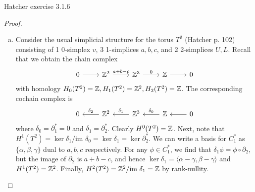 \documentclass{../../mathnotes}
\begin{document}
\begin{prop}
    Hatcher exercise 3.1.6
\end{prop}
\begin{proof}\hfill
    \begin{enumerate}[(a)]
        \item Consider the usual simplicial structure for the torus $T^2$ (Hatcher p. 102) consisting
            of 1 0-simplex $v$, 3 1-simplices $a,b,c$, and 2 2-simplices $U,L$. Recall that
            we obtain the chain complex
            \begin{equation*}
                \begin{tikzcd}
                    0\ar{r} & \Z^2\ar{r}{a+b-c} & \Z^3\ar{r}{0} & \Z\ar{r} & 0
                \end{tikzcd}
            \end{equation*}
            with homology $H_0(T^2)=\mathbb{Z},H_1(T^2)=\mathbb{Z}^2,H_2(T^2)=\mathbb{Z}$. The corresponding cochain complex is
            \begin{equation*}
                \begin{tikzcd}
                    0 & \Z^2\ar[swap]{l}{\delta_2} & \Z^3\ar[swap]{l}{\delta_1} & \Z\ar[swap]{l}{\delta_0} & 0\ar{l}
                \end{tikzcd}
            \end{equation*}
            where $\delta_0=\partial_1^*=0$ and $\delta_1=\partial_2^*$. Clearly $H^0(T^2)=\mathbb{Z}$. Next, note that
            $H^1(T^2)=\ker\delta_1/\text{im }\delta_0=\ker\delta_1=\ker\partial_2^*$. We can write a basis for $C_1^*$
            as $\{\alpha,\beta,\gamma\}$ dual to $a,b,c$ respectively. For any $\phi\in C_1^*$, we find that
            $\delta_1\phi=\phi\circ\partial_2$, but the image of $\partial_2$ is $a+b-c$, and hence
            $\ker\delta_1=\langle \alpha-\gamma,\beta-\gamma \rangle$ and $H^1(T^2)=\mathbb{Z}^2$. Finally,
            $H^2(T^2)=\mathbb{Z}^2/\text{im }\delta_1=\mathbb{Z}$ by rank-nullity.


\end{enumerate}
\end{proof}
\end{document}
